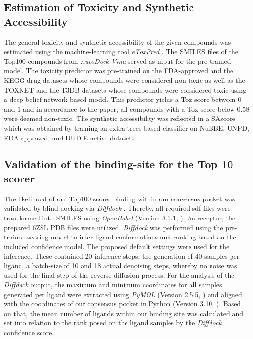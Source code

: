 \documentclass[11pt, letterpaper, titlepage]{article}
\renewcommand{\cite}{\parencite}
\begin{document}
\subsection{Estimation of Toxicity and Synthetic Accessibility}
The general toxicity and synthetic accessibility of the given compounds was estimated using the machine-learning tool \textit{eToxPred} \cite{pu2019toxpred}. The SMILES files of the Top100 compounds from \textit{AutoDock Vina} \cite{Trott.2010} served as input for the pre-trained model. The toxicity predictor was pre-trained on the FDA-approved and the KEGG-drug datasets whose compounds were considered non-toxic as well as the TOXNET and the T3DB datasets whose compounds were considered toxic using a deep-belief-network based model. This predictor yields a Tox-score between 0 and 1 and in accordance to the paper, all compounds with a Tox-score below 0.58 were deemed non-toxic. The synthetic accessibility was reflected in a \ac{SAscore} which was obtained by training an extra-trees-based classifier on NuBBE, UNPD, FDA-approved, and DUD-E-active datasets.
 
\subsection{Validation of the binding-site for the Top 10 scorer}
The likelihood of our Top100 scorer binding within our consensus pocket was validated by blind docking via \textit{Diffdock} \cite{Corso.2022}. Thereby, all required sdf files were transformed into SMILES using \textit{OpenBabel} (Version 3.1.1, \textcite{OpenBabel}). As receptor, the prepared 6ZSL PDB files were utilized. \textit{Diffdock} was performed using the pre-trained scoring model to infer ligand conformations and ranking based on the included confidence model. The proposed default settings were used for the inference. These contained 20 inference steps, the generation of 40 samples per ligand, a batch-size of 10 and 18 actual denoising steps, whereby no noise was used for the final step of the reverse diffusion process. For the analysis of the \textit{Diffdock} output, the maximum and minimum coordinates for all samples generated per ligand were extracted using \textit{PyMOL} (Version 2.5.5, \textcite{PyMOL}) and aligned with the coordinates of our consensus pocket in Python (Version 3.10, \textcite{Python}). Based on that, the mean number of ligands within our binding site was calculated and set into relation to the rank posed on the ligand samples by the \textit{Diffdock} confidence score.
\end{document}
